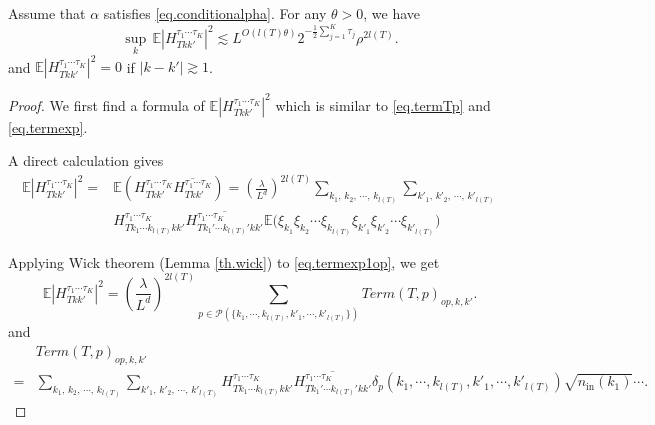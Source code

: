 \begin{prop}\label{prop.treetermsvarianceoperator}
Assume that $\alpha$ satisfies \eqref{eq.conditionalpha}. For any $\theta>0$, we have
\begin{equation}
    \sup_k\, \mathbb{E}|H^{\tau_1\cdots \tau_{K}}_{Tkk'}|^2\lesssim L^{O(l(T)\theta)} 2^{-\frac{1}{2}\sum_{j=1}^K \tau_{j}} \rho^{2l(T)}.
\end{equation}
and $\mathbb{E}|H^{\tau_1\cdots \tau_{K}}_{Tkk'}|^2=0$ if $|k-k'|\gtrsim 1$.
\end{prop}

\begin{proof} We first find a formula of $\mathbb{E}|H^{\tau_1\cdots \tau_{K}}_{Tkk'}|^2$ which is similar to \eqref{eq.termTp} and \eqref{eq.termexp}.

A direct calculation gives
\begin{equation}\label{eq.termexp1op}
\begin{split}
    \mathbb{E}|H^{\tau_1\cdots \tau_{K}}_{Tkk'}|^2=&\mathbb{E}(H^{\tau_1\cdots \tau_{K}}_{Tkk'}\overline{H^{\tau_1\cdots \tau_{K}}_{Tkk'}})=\left(\frac{\lambda}{L^{d}}\right)^{2l(T)}
    \sum_{k_1,\, k_2,\, \cdots,\, k_{l(T)}}\sum_{k'_1,\, k'_2,\, \cdots,\, k'_{l(T)}}
    \\[0.5em]
    & H^{\tau_1\cdots \tau_{K}}_{Tk_1\cdots k_{l(T)}kk'} \overline{H^{\tau_1\cdots \tau_{K}}_{Tk_1'\cdots k_{l(T)}'kk'}}  \mathbb{E}\Big(\xi_{k_1}\xi_{k_2}\cdots\xi_{k_{l(T)}}\xi_{k'_1}\xi_{k'_2}\cdots\xi_{k'_{l(T)}}\Big)
\end{split}
\end{equation}

Applying Wick theorem (Lemma \ref{th.wick}) to \eqref{eq.termexp1op}, we get
\begin{equation}\label{eq.termexpop}
\mathbb{E}|H^{\tau_1\cdots \tau_{K}}_{Tkk'}|^2=\left(\frac{\lambda}{L^{d}}\right)^{2l(T)}
    \sum_{p\in \mathcal{P}(\{k_1,\cdots, k_{l(T)}, k'_1,\cdots, k'_{l(T)}\})} Term(T, p)_{op,k,k
    '}.
\end{equation}
and
\begin{equation}\label{eq.termTpop}
\begin{split}
    &Term(T, p)_{op,k,k
    '}
    \\
    =&\sum_{k_1,\, k_2,\, \cdots,\, k_{l(T)}}\sum_{k'_1,\, k'_2,\, \cdots,\, k'_{l(T)}} H^{\tau_1\cdots \tau_{K}}_{Tk_1\cdots k_{l(T)}kk'} \overline{H^{\tau_1\cdots \tau_{K}}_{Tk_1'\cdots k_{l(T)}'kk'}} \delta_{p}(k_1,\cdots, k_{l(T)}, k'_1,\cdots, k'_{l(T)})\sqrt{n_{\textrm{in}}(k_1)}\cdots.
\end{split}
\end{equation}


\end{proof}
